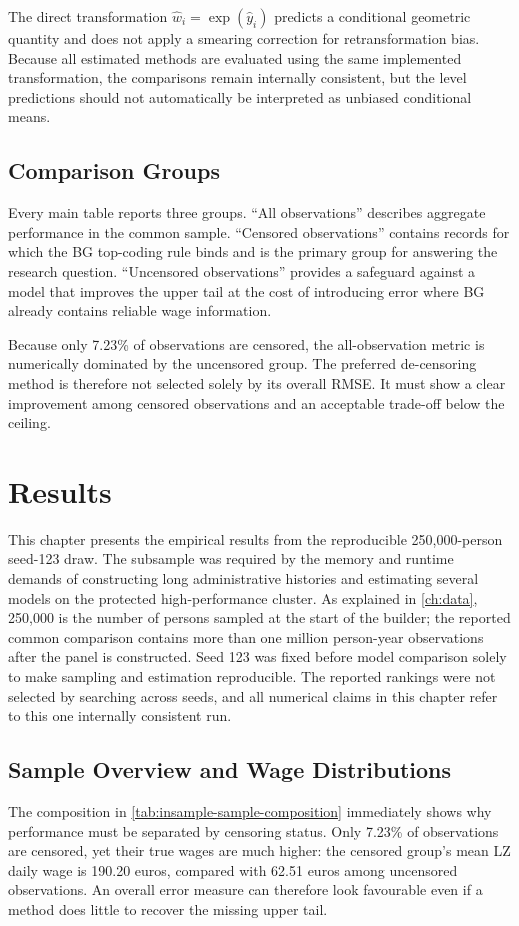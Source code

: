 \documentclass[12pt,a4paper,oneside,titlepage]{book}
\begin{document}
The direct transformation $\widehat w_i=\exp(\widehat y_i)$ predicts a conditional geometric quantity and does not apply a smearing correction for retransformation bias. Because all estimated methods are evaluated using the same implemented transformation, the comparisons remain internally consistent, but the level predictions should not automatically be interpreted as unbiased conditional means.

\section{Comparison Groups}
Every main table reports three groups. ``All observations'' describes aggregate performance in the common sample. ``Censored observations'' contains records for which the BG top-coding rule binds and is the primary group for answering the research question. ``Uncensored observations'' provides a safeguard against a model that improves the upper tail at the cost of introducing error where BG already contains reliable wage information.

Because only 7.23\% of observations are censored, the all-observation metric is numerically dominated by the uncensored group. The preferred de-censoring method is therefore not selected solely by its overall RMSE. It must show a clear improvement among censored observations and an acceptable trade-off below the ceiling.

\chapter{Results}
\label{ch:results}

This chapter presents the empirical results from the reproducible 250,000-person seed-123 draw. The subsample was required by the memory and runtime demands of constructing long administrative histories and estimating several models on the protected high-performance cluster. As explained in \cref{ch:data}, 250,000 is the number of persons sampled at the start of the builder; the reported common comparison contains more than one million person-year observations after the panel is constructed. Seed 123 was fixed before model comparison solely to make sampling and estimation reproducible. The reported rankings were not selected by searching across seeds, and all numerical claims in this chapter refer to this one internally consistent run.

\section{Sample Overview and Wage Distributions}
The composition in \cref{tab:insample-sample-composition} immediately shows why performance must be separated by censoring status. Only 7.23\% of observations are censored, yet their true wages are much higher: the censored group's mean LZ daily wage is 190.20 euros, compared with 62.51 euros among uncensored observations. An overall error measure can therefore look favourable even if a method does little to recover the missing upper tail.
\end{document}
